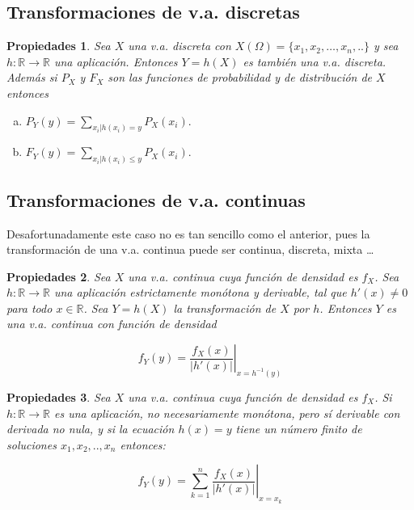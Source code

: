 \documentclass[handout]{beamer}\usepackage[]{graphicx}\usepackage[]{color}
\newcommand{\RR}{\mathbb{R}}
\renewcommand{\leq}{\leqslant}
\theoremstyle{plain}
\newtheorem{prop}{Propiedades}
\theoremstyle{definition}
\begin{document}
\subsection{Transformaciones de v.a. discretas}


\begin{frame}


\begin{prop}
Sea $X$ una v.a. discreta con \newline
$X(\Omega)=\{x_{1},x_{2},\ldots,x_{n},..\}$ y sea $h:\RR\to\RR$ una aplicación.
Entonces $Y=h(X)$ es también una v.a. discreta. Además si $P_X$
y $F_{X}$ son las funciones de probabilidad y de distribución de
$X$ entonces

\begin{enumerate}[a)]
\item $\displaystyle P_{Y}(y)=\sum_{x_{i}|h(x_{i})=y}P_X(x_{i}).$
\item $\displaystyle F_{Y}(y)=\sum_{x_{i}|h(x_{i})\leq y} P_X(x_{i}).$
\end{enumerate}
\end{prop}
\end{frame}
\subsection{Transformaciones de v.a. continuas}



\begin{frame}



Desafortunadamente este caso no es tan sencillo como el anterior, pues la
transformación de una v.a. continua puede ser continua, discreta, mixta \ldots

\begin{prop}
Sea $X$ una v.a. continua cuya función de densidad es $f_{X}$. Sea
$h:\RR\to\RR$ una aplicación estrictamente monótona y derivable, tal
que $h'(x)\not=0$ para todo $x\in\RR$. Sea $Y=h(X)$ la
transformación de $X$ por $h$. Entonces $Y$ es una v.a. continua con función
de densidad

$$f_{Y}(y)=\left.\frac{f_{X}(x)}
{\left|h'(x)\right|}\right|_{x=h^{-1}(y)}$$
\end{prop}
\end{frame}

\begin{frame}

\begin{prop}
Sea $X$ una v.a. continua cuya función de densidad es $f_{X}$. Si
$h:\RR\to\RR$ es  una aplicación, no necesariamente monótona,
pero sí derivable con derivada no nula, y si
la ecuación $h(x)=y$ tiene un número finito de soluciones
$x_{1},x_{2},..,x_{n}$ entonces:

$$\displaystyle f_{Y}(y)=\left.\sum_{k=1}^{n} \frac{f_{X}(x)}
{\left|h'(x)\right|}\right|_{x=x_{k}}$$
\end{prop}
\end{frame}
\end{document}
